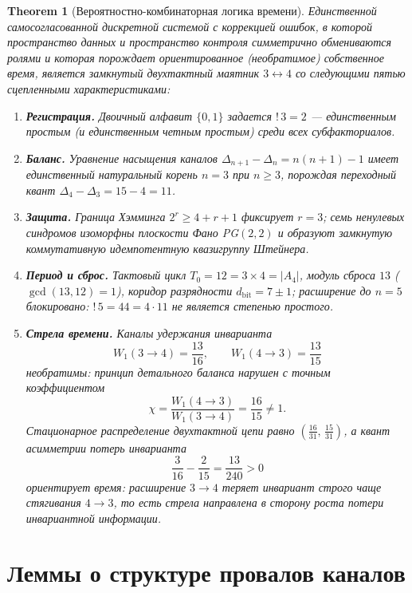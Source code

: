 \documentclass[11pt,a4paper]{article}
\newtheorem{theorem}{Theorem}
\newcommand{\subfact}{\mathord{!}\,}
\begin{document}
\begin{theorem}[Вероятностно-комбинаторная логика времени]\label{th:main}
Единственной самосогласованной дискретной системой с коррекцией ошибок, в которой
пространство данных и пространство контроля симметрично обмениваются ролями и
которая порождает ориентированное (необратимое) собственное время, является
замкнутый двухтактный маятник $3 \leftrightarrow 4$ со следующими пятью
сцепленными характеристиками:
\begin{enumerate}
\item[(i)] \textbf{Регистрация.} Двоичный алфавит $\{0,1\}$ задается
$\subfact{3} = 2$ --- единственным простым (и единственным четным простым) среди
всех субфакториалов.
\item[(ii)] \textbf{Баланс.} Уравнение насыщения каналов
$\Delta_{n+1} - \Delta_n = n(n+1) - 1$ имеет единственный натуральный корень
$n = 3$ при $n \ge 3$, порождая переходный квант
$\Delta_4 - \Delta_3 = 15 - 4 = 11$.
\item[(iii)] \textbf{Защита.} Граница Хэмминга $2^r \ge 4 + r + 1$ фиксирует
$r = 3$; семь ненулевых синдромов изоморфны плоскости Фано PG$(2,2)$ и образуют
замкнутую коммутативную идемпотентную квазигруппу Штейнера.
\item[(iv)] \textbf{Период и сброс.} Тактовый цикл $T_0 = 12 = 3 \times 4 = |A_4|$,
модуль сброса $13$ ($\gcd(13,12) = 1$), коридор разрядности $d_{\mathrm{bit}} = 7 \pm 1$;
расширение до $n = 5$ блокировано: $\subfact{5} = 44 = 4 \cdot 11$ не является
степенью простого.
\item[(v)] \textbf{Стрела времени.} Каналы удержания инварианта
\[
W_1(3 \to 4) = \frac{13}{16}, \qquad
W_1(4 \to 3) = \frac{13}{15}
\]
необратимы: принцип детального баланса нарушен с точным коэффициентом
\[
\chi = \frac{W_1(4 \to 3)}{W_1(3 \to 4)} = \frac{16}{15} \ne 1 .
\]
Стационарное распределение двухтактной цепи равно
$\left(\frac{16}{31},\,\frac{15}{31}\right)$, а квант асимметрии потерь инварианта
\[
\frac{3}{16} - \frac{2}{15} = \frac{13}{240} > 0
\]
ориентирует время: расширение $3 \to 4$ теряет инвариант строго чаще стягивания
$4 \to 3$, то есть стрела направлена в сторону роста потери инвариантной
информации.
\end{enumerate}
\end{theorem}

\section{Леммы о структуре провалов каналов}
\end{document}
